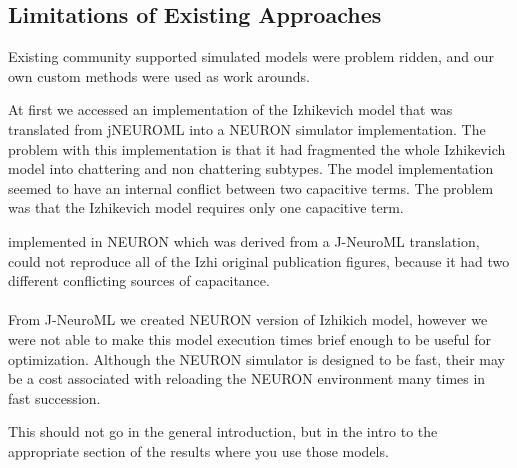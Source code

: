 \subsection{Limitations of Existing Approaches} 
Existing community supported simulated models were problem ridden, and our own custom methods were used as work arounds.

At first we accessed an implementation of the Izhikevich model that was translated from jNEUROML into a NEURON simulator implementation. The problem with this implementation is that it had fragmented the whole Izhikevich model into chattering and non chattering subtypes. The model implementation seemed to have an internal conflict between two capacitive terms. The problem was that the Izhikevich model requires only one capacitive term.

implemented in NEURON which was derived from a J-NeuroML translation, could not reproduce all of the Izhi original publication figures, because it had two different conflicting sources of capacitance.\\
\\
From J-NeuroML we created NEURON version of Izhikich model, however we were not able to make this model execution times brief enough to be useful for optimization. Although the NEURON simulator is designed to be fast, their may be a cost associated with reloading the NEURON environment many times in fast succession.

This should not go in the general introduction, but in the intro to the appropriate section of the results where you use those models.
